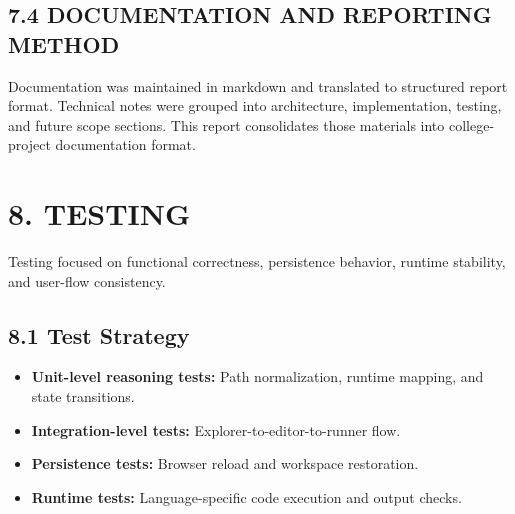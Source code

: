 \subsection{7.4 DOCUMENTATION AND REPORTING METHOD}
Documentation was maintained in markdown and translated to structured report format. Technical notes were grouped into architecture, implementation, testing, and future scope sections. This report consolidates those materials into college-project documentation format.

\newpage
\section{8. TESTING}

Testing focused on functional correctness, persistence behavior, runtime stability, and user-flow consistency.

\subsection*{8.1 Test Strategy}
\begin{itemize}[leftmargin=8mm]
\item \textbf{Unit-level reasoning tests:} Path normalization, runtime mapping, and state transitions.
\item \textbf{Integration-level tests:} Explorer-to-editor-to-runner flow.
\item \textbf{Persistence tests:} Browser reload and workspace restoration.
\item \textbf{Runtime tests:} Language-specific code execution and output checks.
\end{itemize}

